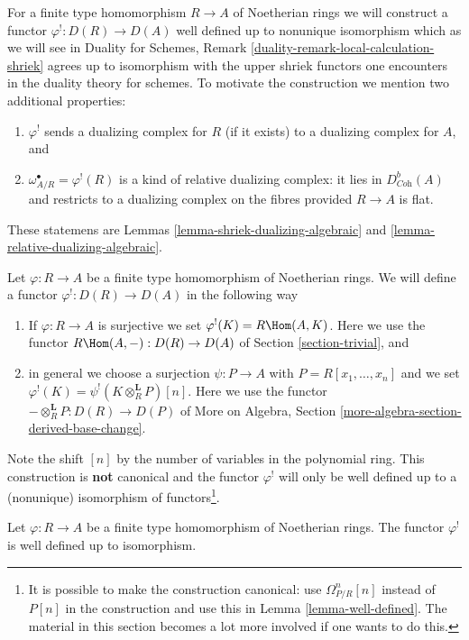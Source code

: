 \noindent
For a finite type homomorphism $R \to A$ of Noetherian rings
we will construct a functor $\varphi^! : D(R) \to D(A)$
well defined up to nonunique isomorphism which
as we will see in Duality for Schemes, Remark
\ref{duality-remark-local-calculation-shriek}
agrees up to isomorphism with the upper shriek functors
one encounters in the duality theory for schemes.
To motivate the construction we mention two additional properties:
\begin{enumerate}
\item $\varphi^!$ sends a dualizing complex for $R$ (if it exists)
to a dualizing complex for $A$, and
\item $\omega_{A/R}^\bullet = \varphi^!(R)$ is a kind of
relative dualizing complex: it lies in $D^b_{\textit{Coh}}(A)$ and restricts
to a dualizing complex on the fibres provided $R \to A$ is flat.
\end{enumerate}
These statemens are Lemmas \ref{lemma-shriek-dualizing-algebraic} and
\ref{lemma-relative-dualizing-algebraic}.

\medskip\noindent
Let $\varphi : R \to A$ be a finite type homomorphism of Noetherian rings.
We will define a functor $\varphi^! : D(R) \to D(A)$ in the following way
\begin{enumerate}
\item If $\varphi : R \to A$ is surjective we set
$\varphi^!(K) = R\Hom(A, K)$. Here we use the functor
$R\Hom(A, -) : D(R) \to D(A)$ of
Section \ref{section-trivial}, and
\item in general we choose a surjection $\psi : P \to A$ with
$P = R[x_1, \ldots, x_n]$ and we set
$\varphi^!(K) = \psi^!(K \otimes_R^\mathbf{L} P)[n]$.
Here we use the functor
$- \otimes_R^\mathbf{L} P : D(R) \to D(P)$
of More on Algebra, Section \ref{more-algebra-section-derived-base-change}.
\end{enumerate}
Note the shift $[n]$ by the number of variables in the polynomial
ring. This construction is {\bf not} canonical and the functor
$\varphi^!$ will only be well defined up to a (nonunique) isomorphism of
functors\footnote{It is possible to make the construction canonical:
use $\Omega^n_{P/R}[n]$ instead of $P[n]$ in the
construction and use this in Lemma \ref{lemma-well-defined}.
The material in this section becomes a lot more involved
if one wants to do this.}.

\begin{lemma}
\label{lemma-well-defined}
Let $\varphi : R \to A$ be a finite type homomorphism of
Noetherian rings. The functor $\varphi^!$ is well defined
up to isomorphism.
\end{lemma}

